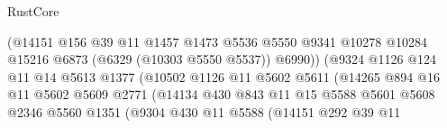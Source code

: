 \begin{lexlean}{RustCore}
\begin{coremodule}
                                        (@14151
                                          @156
                                          @39
                                          @11
                                          @1457
                                          @1473
                                          @5536
                                          @5550
                                          @9341
                                          @10278
                                          @10284
                                          @15216
                                          @6873
                                          (@6329 (@10303 @5550 @5537))
                                          @6990))
                                      (@9324
                                        @1126
                                        @124
                                        @11
                                        @14
                                        @5613
                                        @1377
                                        (@10502
                                          @1126
                                          @11
                                          @5602
                                          @5611
                                          (@14265
                                            @894
                                            @16
                                            @11
                                            @5602
                                            @5609
                                            @2771
                                            (@14134
                                              @430
                                              @843
                                              @11
                                              @15
                                              @5588
                                              @5601
                                              @5608
                                              @2346
                                              @5560
                                              @1351
                                              (@9304
                                                @430
                                                @11
                                                @5588
                                                (@14151
                                                  @292
                                                  @39
                                                  @11

\end{coremodule}
\end{lexlean}
